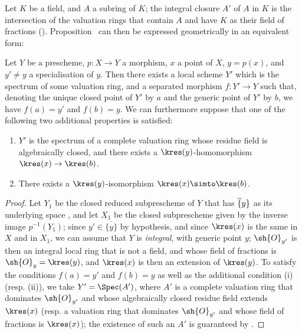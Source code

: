 \begin{env}[7.1.3]
\label{II.7.1.3}
Let $K$ be a field, and $A$ a subring of $K$;
the integral closure $A'$ of $A$ in $K$ is the intersection of the valuation rings that contain $A$ and have $K$ as their field of fractions (\cite[p.~51, th.~2]{I-11}).
Proposition~ can then be expressed geometrically in an equivalent form:
\end{env}

\begin{proposition}[7.1.4]
\label{II.7.1.4}
Let $Y$ be a prescheme, $p:X\to Y$ a morphism, $x$ a point of $X$, $y=p(x)$, and $y'\neq y$ a specialisation  of $y$.
Then there exists a local scheme $Y'$ which is the spectrum of some valuation ring, and a separated morphism $f:Y'\to Y$ such that, denoting the unique closed point of $Y'$ by $a$ and the generic point of $Y'$ by $b$, we have $f(a)=y'$ and $f(b)=y$.
We can furthermore suppose that one of the following two additional properties is satisfied:
\begin{enumerate}
    \item[\rm{(i)}] $Y'$ is the spectrum of a complete valuation ring whose residue field is algebraically closed, and there exists a $\kres(y)$-homomorphism $\kres(x)\to\kres(b)$.
    \item[\rm{(ii)}] There exists a $\kres(y)$-isomorphism $\kres(x)\simto\kres(b)$.
\end{enumerate}
\end{proposition}

\begin{proof}
Let $Y_1$ be the closed reduced subprescheme of $Y$ that has $\overline\{y\}$ as its underlying space , and let $X_1$ be the closed subprescheme given by the inverse image $p^{-1}(Y_1)$;
since $y'\in\overline{\{y\}}$ by hypothesis, and since $\kres(x)$ is the same in $X$ and in $X_1$, we can assume that $Y$ is \emph{integral}, with generic point $y$;
$\sh{O}_{y'}$ is then an integral local ring that is not a field, and whose field of fractions is $\sh{O}_y=\kres(y)$, and $\kres(x)$ is then an extension of $\kres(y)$.
To satisfy the conditions $f(a)=y'$ and $f(b)=y$ as well as the additional condition (i) (resp. (ii)), we take $Y'=\Spec(A')$, where $A'$ is a complete valuation ring that dominates $\sh{O}_{y'}$ and whose algebraically closed residue field extends $\kres(x)$ (resp. a valuation ring that dominates $\sh{O}_{y'}$ and whose field of fractions is $\kres(x)$);
the existence of such an $A'$ is guaranteed by .
\end{proof}

